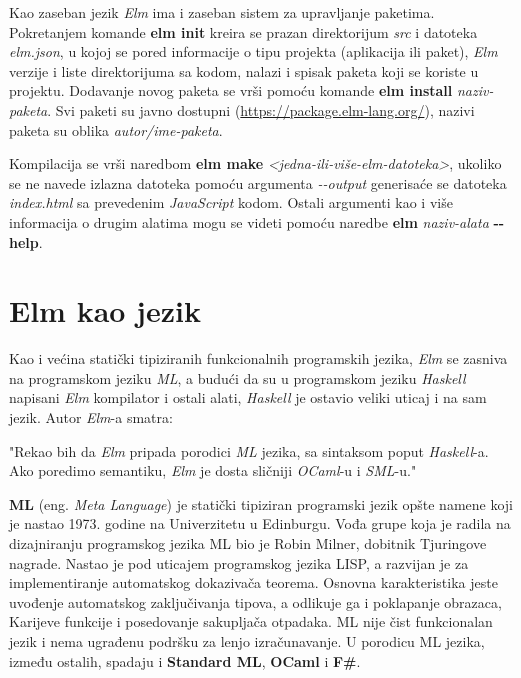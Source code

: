 \documentclass[12pt,oneside]{memoir}
\begin{document}
 
Kao zaseban jezik \emph{Elm} ima i zaseban sistem za upravljanje paketima.
Pokretanjem komande \textbf{elm init} kreira se prazan direktorijum \emph{src} i 
datoteka \emph{elm.json}, u kojoj se pored informacije o tipu projekta (aplikacija ili 
paket), \emph{Elm} verzije i liste direktorijuma sa kodom, nalazi i spisak paketa koji se 
koriste u projektu. Dodavanje novog paketa se vrši pomoću komande \textbf{elm install} 
\emph{naziv-paketa}. Svi paketi su javno dostupni (\url{https://package.elm-lang.org/}),
nazivi paketa su oblika \emph{autor/ime-paketa}.

Kompilacija se vrši naredbom \textbf{elm make} \emph{<jedna-ili-više-elm-datoteka>},
ukoliko se ne navede izlazna datoteka pomoću argumenta \emph{-{}-output} generisaće 
se datoteka \emph{index.html} sa prevedenim \emph{JavaScript} kodom. Ostali argumenti kao i
više informacija o drugim alatima mogu se videti pomoću naredbe \textbf{elm}
\emph{naziv-alata} \textbf{-{}-help}.

\section{Elm kao jezik}
Kao i većina statički tipiziranih funkcionalnih programskih jezika, \emph{Elm} se zasniva na
programskom jeziku \emph{ML}, a budući da su u programskom jeziku \emph{Haskell} napisani \emph{Elm} kompilator
i ostali alati, \emph{Haskell} je ostavio veliki uticaj i na sam jezik. Autor \emph{Elm}-a smatra:
\begin{displayquote}
"Rekao bih da \emph{Elm} pripada porodici \emph{ML} jezika, sa sintaksom poput \emph{Haskell}-a. Ako poredimo semantiku,
\emph{Elm} je dosta sličniji \emph{OCaml}-u i \emph{SML}-u." \cite{eczaplicki:2015}
\end{displayquote}

\textbf{ML} (eng. \emph{Meta Language})\cite{ml} je statički tipiziran programski jezik opšte 
namene koji je nastao 1973. godine na Univerzitetu u Edinburgu. Vođa grupe koja je radila
na dizajniranju programskog jezika ML bio je Robin Milner, dobitnik Tjuringove nagrade.
Nastao je pod uticajem programskog jezika LISP, a razvijan je za implementiranje automatskog
dokazivača teorema. Osnovna karakteristika jeste uvođenje automatskog zaključivanja tipova, a
odlikuje ga i poklapanje obrazaca, Karijeve funkcije i posedovanje sakupljača otpadaka. ML
nije čist funkcionalan  jezik i nema ugrađenu podršku za lenjo izračunavanje. U porodicu ML 
jezika, između ostalih, spadaju i \textbf{Standard ML}, \textbf{OCaml} i \textbf{F{\#}}.
\end{document}
